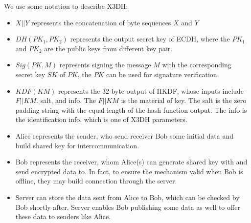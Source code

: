 \documentclass[11pt,en]{elegantpaper}
\begin{document}
We use some notation to describe X3DH:
\begin{itemize}
    \item $X||Y$ represents the concatenation of byte sequences $X$ and $Y$
    \item $DH(PK_1,PK_2)$ represents the output secret key of ECDH, where the $PK_1$ and $PK_2$ are the public keys from different key pair.
    \item $Sig(PK,M)$ represents signing the message $M$ with the corresponding secret key $SK$ of $PK$, the $PK$ can be used for signature verification.
    \item $KDF(KM)$ represents the 32-byte output of HKDF, whose inputs include $F||KM$. salt, and info. The $F||KM$ is the material of key. The salt is the zero padding string with the equal length of the hash function output. The info is the identification info, which is one of X3DH parameters.
    \item Alice represents the sender, who send receiver Bob some initial data and build shared key for intercommunication.
    \item Bob represents the receiver, whom Alice(s) can generate shared key with and send encrypted data to. In fact, to ensure the mechanism valid when Bob is offline, they may build connection through the server.
    \item Server can store the data sent from Alice to Bob, which can be checked by Bob shortly after. Server enables Bob publishing some data as well to offer these data to senders like Alice.
\end{itemize}

\end{document}
